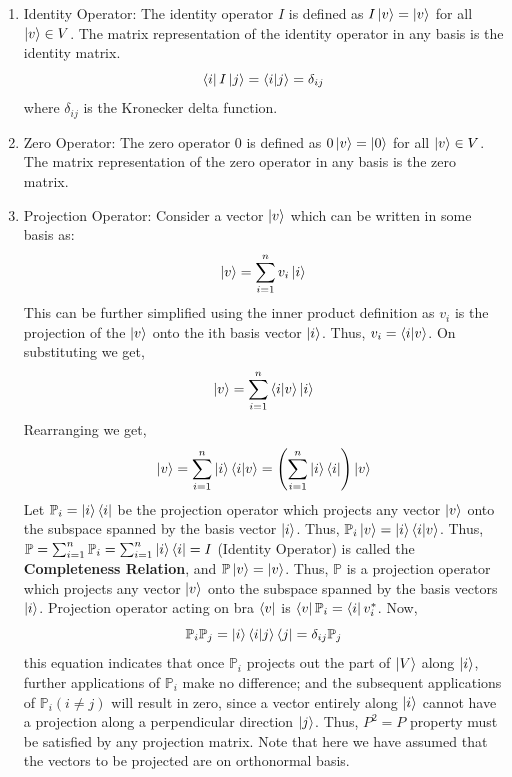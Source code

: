 \begin{enumerate}
    \item Identity Operator: The identity operator $I$ is defined as $I\ket{v}=\ket{v}$ for all $\ket{v}\in V$. The matrix representation of the identity operator in any basis is the identity matrix.
    \[\bra{i}I\ket{j}=\braket{i|j}=\delta_{ij}\] 
    where $\delta_{ij}$ is the Kronecker delta function.
    \item Zero Operator: The zero operator $0$ is defined as $0\ket{v}=\ket{0}$ for all $\ket{v}\in V$. The matrix representation of the zero operator in any basis is the zero matrix.
    \item Projection Operator: Consider a vector $\ket{v}$ which can be written in some basis as:
    \[ \ket{v}=\sum_{i=1}^{n}v_i\ket{i} \]
    This can be further simplified using the inner product definition as $v_i$ is the projection of the $\ket{v}$ onto the ith basis vector $\ket{i}$.
    Thus, $v_i=\braket{i|v}$. On substituting we get,
    \[ \ket{v}=\sum_{i=1}^{n}\braket{i|v}\ket{i} \]
    Rearranging we get,
    \[ \ket{v}=\sum_{i=1}^{n}\ket{i}\braket{i|v} =\left(\sum_{i=1}^n \ket{i}\bra{i} \right) \ket{v}\]
    Let $\mathbb{P}_i = \ket{i}\bra{i}$ be the projection operator which projects any vector $\ket{v}$ onto the subspace spanned by the basis vector $\ket{i}$.
    Thus, $\mathbb{P}_i\ket{v}=\ket{i}\braket{i|v}$. Thus, $\mathbb{P}=\sum_{i=1}^n \mathbb{P}_i = \sum_{i=1}^n \ket{i}\bra{i} = I$ (Identity Operator) is called the \textbf{Completeness Relation}, and $\mathbb{P}\ket{v}=\ket{v}$. Thus, $\mathbb{P}$ is a projection operator which projects any vector $\ket{v}$ 
    onto the subspace spanned by the basis vectors $\ket{i}$. Projection operator acting on bra $\bra{v}$ is 
    $\bra{v}\mathbb{P}_i=\bra{i}v_i^*$.
    Now, 
    \[\mathbb{P}_i\mathbb{P}_j=\ket{i}\braket{i|j}\bra{j}=\delta_{ij}\mathbb{P}_j\]
    this equation indicates that once $\mathbb{P}_i$ projects out the part of $\ket{V}$ along $\ket{i}$, further applications
    of $\mathbb{P}_i$ make no difference; and the subsequent applications of $\mathbb{P}_i (i \neq j)$ will result in zero, since 
    a vector entirely along $\ket{i}$ cannot have a projection along a perpendicular direction $\ket{j}$. Thus, $P^2=P$ property must be satisfied by any projection matrix. Note that here we have assumed that the vectors to be projected
    are on orthonormal basis.


\end{enumerate}
